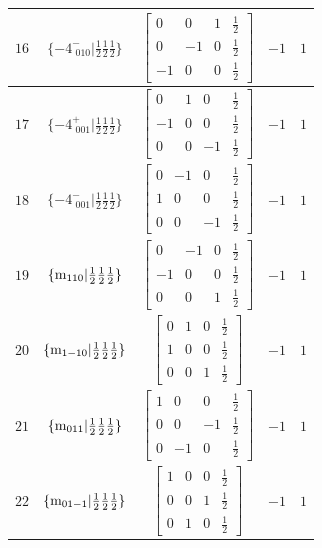 \documentclass[fleqn,8pt]{jsarticle}
\begin{document}
\begin{longtable}{ccccc}
$ 16 $ & $ \{-4^{-}_{\,\,010}|\frac{1}{2} \frac{1}{2} \frac{1}{2}\} $ & $ \begin{bmatrix} 0 & 0 & 1 & \frac{1}{2} \\ 0 & -1 & 0 & \frac{1}{2} \\ -1 & 0 & 0 & \frac{1}{2} \end{bmatrix} $ & $ -1 $ & $ 1 $ \\ \hline
$ 17 $ & $ \{-4^{+}_{\,\,001}|\frac{1}{2} \frac{1}{2} \frac{1}{2}\} $ & $ \begin{bmatrix} 0 & 1 & 0 & \frac{1}{2} \\ -1 & 0 & 0 & \frac{1}{2} \\ 0 & 0 & -1 & \frac{1}{2} \end{bmatrix} $ & $ -1 $ & $ 1 $ \\ \hline
$ 18 $ & $ \{-4^{-}_{\,\,001}|\frac{1}{2} \frac{1}{2} \frac{1}{2}\} $ & $ \begin{bmatrix} 0 & -1 & 0 & \frac{1}{2} \\ 1 & 0 & 0 & \frac{1}{2} \\ 0 & 0 & -1 & \frac{1}{2} \end{bmatrix} $ & $ -1 $ & $ 1 $ \\ \hline
$ 19 $ & $ \{{\rm m}_{110}|\frac{1}{2} \frac{1}{2} \frac{1}{2}\} $ & $ \begin{bmatrix} 0 & -1 & 0 & \frac{1}{2} \\ -1 & 0 & 0 & \frac{1}{2} \\ 0 & 0 & 1 & \frac{1}{2} \end{bmatrix} $ & $ -1 $ & $ 1 $ \\ \hline
$ 20 $ & $ \{{\rm m}_{1-10}|\frac{1}{2} \frac{1}{2} \frac{1}{2}\} $ & $ \begin{bmatrix} 0 & 1 & 0 & \frac{1}{2} \\ 1 & 0 & 0 & \frac{1}{2} \\ 0 & 0 & 1 & \frac{1}{2} \end{bmatrix} $ & $ -1 $ & $ 1 $ \\ \hline
$ 21 $ & $ \{{\rm m}_{011}|\frac{1}{2} \frac{1}{2} \frac{1}{2}\} $ & $ \begin{bmatrix} 1 & 0 & 0 & \frac{1}{2} \\ 0 & 0 & -1 & \frac{1}{2} \\ 0 & -1 & 0 & \frac{1}{2} \end{bmatrix} $ & $ -1 $ & $ 1 $ \\ \hline
$ 22 $ & $ \{{\rm m}_{01-1}|\frac{1}{2} \frac{1}{2} \frac{1}{2}\} $ & $ \begin{bmatrix} 1 & 0 & 0 & \frac{1}{2} \\ 0 & 0 & 1 & \frac{1}{2} \\ 0 & 1 & 0 & \frac{1}{2} \end{bmatrix} $ & $ -1 $ & $ 1 $ \\ \hline

\end{longtable}
\end{document}
